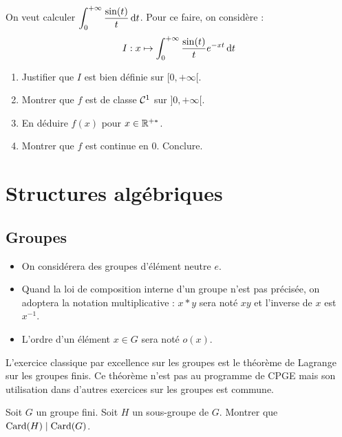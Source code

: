 \documentclass[12pt,a4paper]{exo_book}
\begin{document}
\begin{exo}
    On veut calculer $\displaystyle \int_0^{+\infty} \frac{\sin(t)}{t} {\rm \, d} t$. Pour ce faire, on considère :
    \[I : x \mapsto \int_0^{+\infty} \frac{\sin(t)}{t} e^{-xt} {\rm \, d} t\]
    \begin{enumerate}
        \item Justifier que $I$ est bien définie sur $[0,+\infty[$.
        \item Montrer que $f$ est de classe $\mathcal{C}^1$ sur $]0,+\infty[$.
        \item En déduire $f(x)$ pour $x \in \mathbb{R}^{+*}$.
        \item Montrer que $f$ est continue en $0$. Conclure.
    \end{enumerate}
\end{exo}


\chapter{Structures algébriques}

\section{Groupes}

\begin{notation}
\hspace{1pt}
\begin{itemize}
    \item On considérera des groupes d'élément neutre $e$.
    \item Quand la loi de composition interne d'un groupe n'est pas précisée, on adoptera la notation multiplicative : $x * y$ sera noté $xy$ et l'inverse de $x$ est $x^{-1}$.
    \item L'ordre d'un élément $x\in G$ sera noté $o(x)$.
\end{itemize}
\end{notation}

L'exercice classique par excellence sur les groupes est le théorème de Lagrange sur les groupes finis. Ce théorème n'est pas au programme de CPGE mais son utilisation dans d'autres exercices sur les groupes est commune.

\begin{exo}
 Soit $G$ un groupe fini. Soit $H$ un sous-groupe de $G$. Montrer que $\operatorname{Card} (H) \mid \operatorname{Card} (G)$.
\end{exo}
\end{document}
